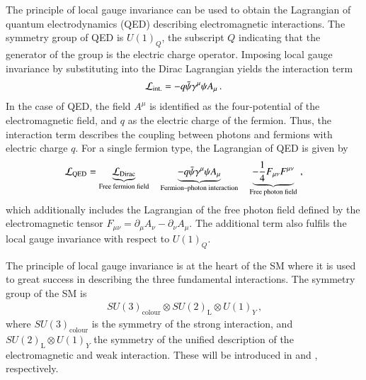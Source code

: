 The principle of local gauge invariance can be used to obtain the Lagrangian of
quantum electrodynamics (QED) describing electromagnetic interactions. The
symmetry group of QED is $U(1)_{Q}$, the subscript $Q$ indicating that the
generator of the group is the electric charge operator. Imposing local gauge
invariance by substituting  into the Dirac
Lagrangian yields the interaction term
\begin{align*}
  \mathcal{L}_{\text{int.}} = - q \bar{\psi} \gamma^\mu \psi A_\mu \,\text{.}
\end{align*}
In the case of QED, the field $A^\mu$ is identified as the four-potential of the
electromagnetic field, and $q$ as the electric charge of the fermion.
Thus, the interaction term describes the coupling between photons and fermions
with electric charge $q$. For a single fermion type, the Lagrangian of QED is
given by
\begin{align*}
  \mathcal{L}_{\text{QED}} = \underbrace{\mathcal{L}_{\text{Dirac}}}_{\text{Free fermion field}}
  \hspace*{1em}
  \underbrace{- q \bar{\psi} \gamma^\mu \psi A_\mu}_{\text{Fermion--photon interaction}}
  \hspace*{1em}
  \underbrace{- \frac{1}{4} F_{\mu\nu} F^{\mu\nu}}_{\text{Free photon field}} \,\text{,}
\end{align*}
which additionally includes the Lagrangian of the free photon field defined by
the electromagnetic tensor
$F_{\mu\nu} = \partial_\mu A_\nu - \partial_\nu A_\mu$. The additional term also
fulfils the local gauge invariance with respect to $U(1)_Q$.

The principle of local gauge invariance is at the heart of the SM where it is
used to great success in describing the three fundamental interactions. The
symmetry group of the SM is
\begin{align*}
  SU(3)_{\text{colour}} \otimes SU(2)_{\text{L}} \otimes U(1)_Y \,\text{,}
\end{align*}
where $SU(3)_{\text{colour}}$ is the symmetry of the strong interaction, and
$SU(2)_{\text{L}} \otimes U(1)_Y$ the symmetry of the unified description of the
electromagnetic and weak interaction. These will be introduced in
 and , respectively.


